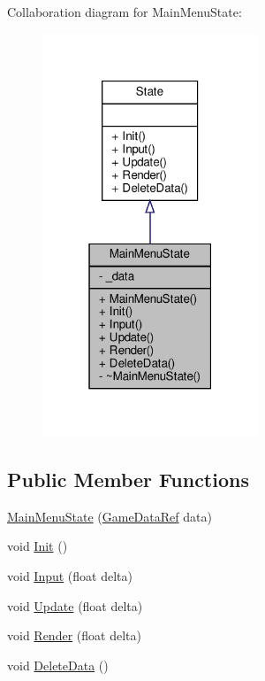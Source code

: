 Collaboration diagram for Main\+Menu\+State\+:
\nopagebreak
\begin{figure}[H]
\begin{center}
\leavevmode
\includegraphics[width=183pt]{classMainMenuState__coll__graph}
\end{center}
\end{figure}
\subsection*{Public Member Functions}
\begin{DoxyCompactItemize}
\item 
\hyperlink{classMainMenuState_a8bf084041900c86967b51354fb26a230}{Main\+Menu\+State} (\hyperlink{game_8h_a513c9dd465a0df41dbb4daf40cc717c2}{Game\+Data\+Ref} data)
\item 
void \hyperlink{classMainMenuState_afab2a9b829a8ef752fed701d5cd260f8}{Init} ()
\item 
void \hyperlink{classMainMenuState_aa62c91d35b5b4a24c0a13c22020845e8}{Input} (float delta)
\item 
void \hyperlink{classMainMenuState_a1605be0d2e5228643d911c7069db3196}{Update} (float delta)
\item 
void \hyperlink{classMainMenuState_af675ec319923f1cf22446808a7735dea}{Render} (float delta)
\item 
void \hyperlink{classMainMenuState_a52c4dad229a1e9851e8742b81bc30abb}{Delete\+Data} ()
\end{DoxyCompactItemize}
